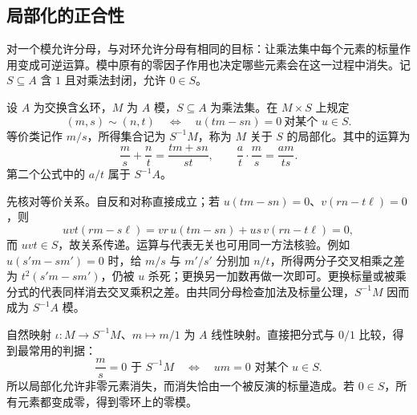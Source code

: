 \subsection{局部化的正合性}
\label{g5:subsec:0202:04}

对一个模允许分母，与对环允许分母有相同的目标：让乘法集中每个元素的标量作用变成可逆运算。模中原有的零因子作用也决定哪些元素会在这一过程中消失。记 \(S\subseteq A\) 含 \(1\) 且对乘法封闭，允许 \(0\in S\)。

\begin{definition}\label{g5:def:module-localization}
	设 \(A\) 为交换含幺环，\(M\) 为 \(A\) 模，\(S\subseteq A\) 为乘法集。在 \(M\times S\) 上规定
	\[
		(m,s)\sim(n,t)
		\quad\Longleftrightarrow\quad
		u(tm-sn)=0\ \text{对某个 }u\in S.
	\]
	等价类记作 \(m/s\)，所得集合记为 \(S^{-1}M\)，称为 \(M\) 关于 \(S\) 的局部化。其中的运算为
	\[
		\frac ms+\frac nt=\frac{tm+sn}{st},\qquad
		\frac at\cdot\frac ms=\frac{am}{ts}.
	\]
	第二个公式中的 \(a/t\) 属于 \(S^{-1}A\)。
\end{definition}

先核对等价关系。自反和对称直接成立；若 \(u(tm-sn)=0\)、\(v(rn-t\ell)=0\)，则
\[
	uvt(rm-s\ell)
	=vr\,u(tm-sn)+us\,v(rn-t\ell)=0,
\]
而 \(uvt\in S\)，故关系传递。运算与代表无关也可用同一方法核验。例如 \(u(s'm-sm')=0\) 时，给 \(m/s\) 与 \(m'/s'\) 分别加 \(n/t\)，所得两分子交叉相乘之差为 \(t^2(s'm-sm')\)，仍被 \(u\) 杀死；更换另一加数再做一次即可。更换标量或被乘分式的代表同样消去交叉乘积之差。由共同分母检查加法及标量公理，\(S^{-1}M\) 因而成为 \(S^{-1}A\) 模。

\ProseParagraphBreak

自然映射 \(\iota:M\rightarrow S^{-1}M\)、\(m\mapsto m/1\) 为 \(A\) 线性映射。直接把分式与 \(0/1\) 比较，得到最常用的判据：
\begin{equation}\label{g5:eq:module-localization-zero}
	\frac ms=0\text{ 于 }S^{-1}M
	\quad\Longleftrightarrow\quad
	um=0\text{ 对某个 }u\in S.
\end{equation}
所以局部化允许非零元素消失，而消失恰由一个被反演的标量造成。若 \(0\in S\)，所有元素都变成零，得到零环上的零模。

